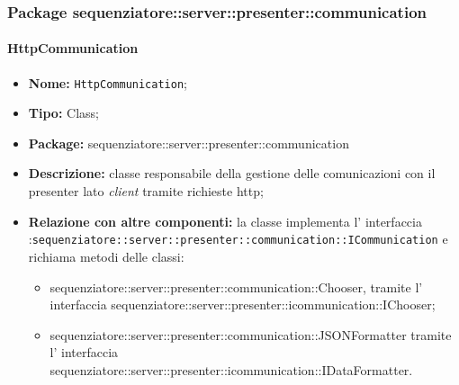 \subsubsection{Package sequenziatore::server::presenter::communication}
\paragraph{HttpCommunication}
	\begin{itemize}
		\item \textbf{Nome:} \texttt{HttpCommunication};
		\item \textbf{Tipo:} Class;
		\item \textbf{Package:} sequenziatore::server::presenter::communication
		\item \textbf{Descrizione:} classe responsabile della gestione delle comunicazioni con il presenter lato \textit{client} tramite richieste http;
		\item \textbf{Relazione con altre componenti:} la classe implementa l' interfaccia :\texttt{sequenziatore::server::presenter::communication::ICommunication} e richiama metodi delle classi:
		\begin{itemize}
			\item sequenziatore::server::presenter::communication::Chooser, tramite l' interfaccia sequenziatore::server::presenter::icommunication::IChooser;
			\item sequenziatore::server::presenter::communication::JSONFormatter tramite l' interfaccia sequenziatore::server::presenter::icommunication::IDataFormatter.
		\end{itemize}
	\end{itemize}
